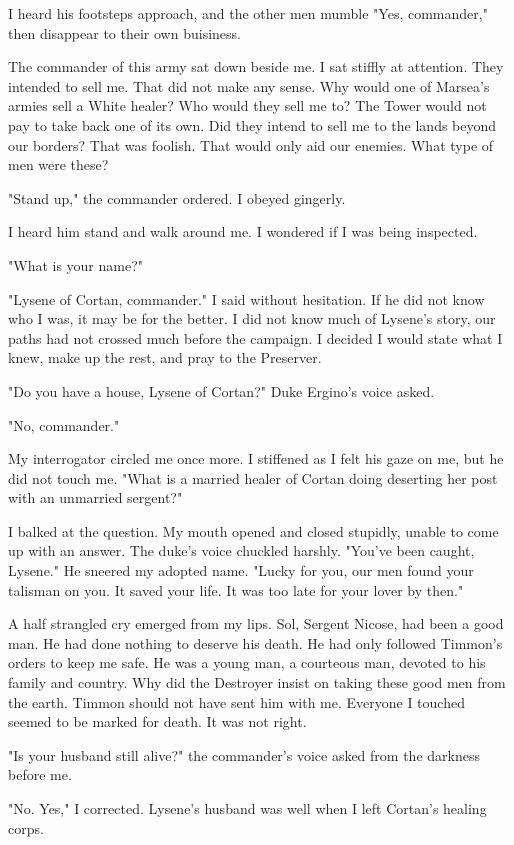 \documentclass{article}
\begin{document}
I heard his footsteps approach, and the other men mumble "Yes, commander," then disappear to their own buisiness. 

The commander of this army sat down beside me. I sat stiffly at attention. They intended to sell me. That did not make any sense. Why would one of Marsea's armies sell a White healer? Who would they sell me to? The Tower would not pay to take back one of its own. Did they intend to sell me to the lands beyond our borders? That was foolish. That would only aid our enemies. What type of men were these?

"Stand up," the commander ordered. I obeyed gingerly.

I heard him stand and walk around me. I wondered if I was being inspected.

"What is your name?"

"Lysene of Cortan, commander." I said without hesitation. If he did not know who I was, it may be for the better. I did not know much of Lysene's story, our paths had not crossed much before the campaign. I decided I would state what I knew, make up the rest, and pray to the Preserver.

"Do you have a house, Lysene of Cortan?" Duke Ergino's voice asked.

"No, commander."

My interrogator circled me once more. I stiffened as I felt his gaze on me, but he did not touch me. "What is a married healer of Cortan doing deserting her post with an unmarried sergent?"

I balked at the question. My mouth opened and closed stupidly, unable to come up with an answer. The duke's voice chuckled harshly. "You've been caught, Lysene." He sneered my adopted name. "Lucky for you, our men found your talisman on you. It saved your life. It was too late for your lover by then."

A half strangled cry emerged from my lips. Sol, Sergent Nicose, had been a good man. He had done nothing to deserve his death. He had only followed Timmon's orders to keep me safe. He was a young man, a courteous man, devoted to his family and country. Why did the Destroyer insist on taking these good men from the earth. Timmon should not have sent him with me. Everyone I touched seemed to be marked for death. It was not right.

"Is your husband still alive?" the commander's voice asked from the darkness before me.

"No. Yes," I corrected. Lysene's husband was well when I left Cortan's healing corps.
\end{document}
